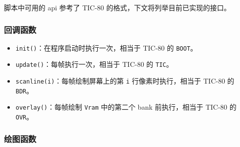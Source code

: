 \documentclass[UTF8]{ctexart}
\begin{document}
脚本中可用的 api 参考了 TIC-80 的格式，下文将列举目前已实现的接口。

\subsubsection{回调函数}

\begin{itemize}
    \item \texttt{init()}：在程序启动时执行一次，相当于 TIC-80 的 \texttt{BOOT}。
    \item \texttt{update()}：每帧执行一次，相当于 TIC-80 的 \texttt{TIC}。
    \item \texttt{scanline(i)}：每帧绘制屏幕上的第 \texttt{i} 行像素时执行，相当于 TIC-80 的 \texttt{BDR}。
    \item \texttt{overlay()}：每帧绘制 \texttt{Vram} 中的第二个 bank 前执行，相当于 TIC-80 的 \texttt{OVR}。
\end{itemize}

\subsubsection{绘图函数}
\end{document}
